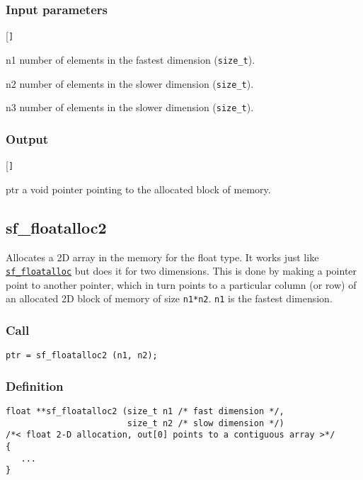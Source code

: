\subsubsection*{Input parameters}
\begin{desclist}{\tt }{\quad}[\tt ]
   \setlength\itemsep{0pt}
   \item[n1] number of elements in the fastest dimension (\texttt{size\_t}).
   \item[n2] number of elements in the slower dimension (\texttt{size\_t}).
   \item[n3] number of elements in the slower dimension (\texttt{size\_t}).
\end{desclist}

\subsubsection*{Output}
\begin{desclist}{\tt }{\quad}[\tt ]
   \setlength\itemsep{0pt}
   \item[ptr] a void pointer pointing to the allocated block of memory.
\end{desclist}




\subsection{{sf\_floatalloc2}}\label{sec:sf_floatalloc2}
Allocates a 2D array in the memory for the float type. It works just like \hyperref[sec:sf_floatalloc]{\texttt{sf\_floatalloc}} but does it for two dimensions. This is done by making a pointer point to another pointer, which in turn points to a particular column (or row) of an allocated 2D block of memory of size \texttt{n1*n2}. \texttt{n1} is the fastest dimension.

\subsubsection*{Call}
\begin{verbatim}ptr = sf_floatalloc2 (n1, n2);\end{verbatim}

\subsubsection*{Definition}
\begin{verbatim}
float **sf_floatalloc2 (size_t n1 /* fast dimension */, 
                        size_t n2 /* slow dimension */)
/*< float 2-D allocation, out[0] points to a contiguous array >*/ 
{
   ...
}
\end{verbatim}

